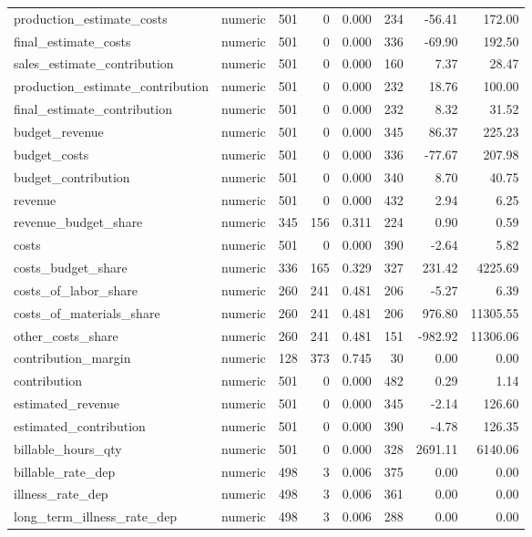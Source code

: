 \begin{landscape}
\begin{longtable}[t]{llrrrrrr}
production\_estimate\_costs & numeric & 501 & 0 & 0.000 & 234 & -56.41 & 172.00\\
final\_estimate\_costs & numeric & 501 & 0 & 0.000 & 336 & -69.90 & 192.50\\
sales\_estimate\_contribution & numeric & 501 & 0 & 0.000 & 160 & 7.37 & 28.47\\
production\_estimate\_contribution & numeric & 501 & 0 & 0.000 & 232 & 18.76 & 100.00\\
final\_estimate\_contribution & numeric & 501 & 0 & 0.000 & 232 & 8.32 & 31.52\\
budget\_revenue & numeric & 501 & 0 & 0.000 & 345 & 86.37 & 225.23\\
budget\_costs & numeric & 501 & 0 & 0.000 & 336 & -77.67 & 207.98\\
budget\_contribution & numeric & 501 & 0 & 0.000 & 340 & 8.70 & 40.75\\
revenue & numeric & 501 & 0 & 0.000 & 432 & 2.94 & 6.25\\
revenue\_budget\_share & numeric & 345 & 156 & 0.311 & 224 & 0.90 & 0.59\\
costs & numeric & 501 & 0 & 0.000 & 390 & -2.64 & 5.82\\
costs\_budget\_share & numeric & 336 & 165 & 0.329 & 327 & 231.42 & 4225.69\\
costs\_of\_labor\_share & numeric & 260 & 241 & 0.481 & 206 & -5.27 & 6.39\\
costs\_of\_materials\_share & numeric & 260 & 241 & 0.481 & 206 & 976.80 & 11305.55\\
other\_costs\_share & numeric & 260 & 241 & 0.481 & 151 & -982.92 & 11306.06\\
contribution\_margin & numeric & 128 & 373 & 0.745 & 30 & 0.00 & 0.00\\
contribution & numeric & 501 & 0 & 0.000 & 482 & 0.29 & 1.14\\
estimated\_revenue & numeric & 501 & 0 & 0.000 & 345 & -2.14 & 126.60\\
estimated\_contribution & numeric & 501 & 0 & 0.000 & 390 & -4.78 & 126.35\\
billable\_hours\_qty & numeric & 501 & 0 & 0.000 & 328 & 2691.11 & 6140.06\\
billable\_rate\_dep & numeric & 498 & 3 & 0.006 & 375 & 0.00 & 0.00\\
illness\_rate\_dep & numeric & 498 & 3 & 0.006 & 361 & 0.00 & 0.00\\
long\_term\_illness\_rate\_dep & numeric & 498 & 3 & 0.006 & 288 & 0.00 & 0.00\\

\end{longtable}
\end{landscape}
